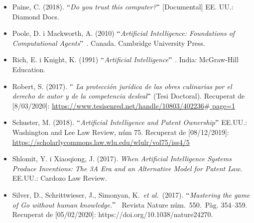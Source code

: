 \documentclass[12pt]{article}
\begin{document}
\begin{itemize}
\vspace{\baselineskip}
	\item Paine, C. (2018). $``$\textit{Do you trust this computer?$"$  }[Documental] EE. UU.: Diamond Docs.\par


\vspace{\baselineskip}
	\item Poole, D. i Mackworth, A. (2010) $``$\textit{Artificial Intelligence: Foundations of Computational Agents$"$ . }Canada. Cambridge University Press.\par


\vspace{\baselineskip}
	\item Rich, E. i Knight, K. (1991) $``$\textit{Artificial Intelligence$"$ . }India:\textit{ }McGraw-Hill Education. \par


\vspace{\baselineskip}
	\item Robert, S. (2017). $``$ \textit{La protección jurídica de las obres culinarias por el derecho de autor y de la competencia desleal$"$  }(Tesi Doctoral). Recuperat de [8/03/2020]: \href{https://www.tesisenred.net/handle/10803/402236}{\textcolor[HTML]{0000FF}{\ul{https://www.tesisenred.net/handle/10803/402236$\#$ page=1}}}\par


\vspace{\baselineskip}
	\item Schuster, M. (2018). $``$\textit{Artificial Intelligence and Patent Ownership$"$ } EE.UU.: Washington and Lee Law Review, núm 75. Recuperat de [08/12/2019]: \href{https://scholarlycommons.law.wlu.edu/wlulr/vol75/iss4/5}{https://scholarlycommons.law.wlu.edu/wlulr/vol75/iss4/5}\par


\vspace{\baselineskip}
	\item Shlomit, Y. i Xiaoqiong, J. (2017). \textit{ When Artificial Intelligence Systems Produce Inventions: The 3A Era and an Alternative Model for Patent Law.} EE.UU.:\textit{ }Cardozo Law Review. \par


\vspace{\baselineskip}
	\item \textcolor[HTML]{222222}{Silver, D., Schrittwieser, J., Simonyan, K. \textit{et al.} (2017). $``$\textit{Mastering the game of Go without human knowledge.}$"$  Revista Nature núm. 550. Pàg. 354–359. Recuperat de [05/02/2020]: \href{https://doi.org/10.1038/nature24270}{}https://doi.org/10.1038/nature24270}\textcolor[HTML]{222222}{. }\par



\end{itemize}
\end{document}
